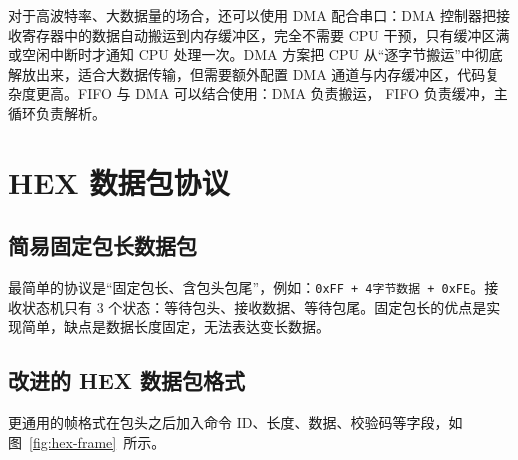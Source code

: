 对于高波特率、大数据量的场合，还可以使用 DMA 配合串口：DMA 控制器把接收寄存器中的数据自动搬运到内存缓冲区，完全不需要 CPU 干预，只有缓冲区满或空闲中断时才通知 CPU 处理一次。DMA 方案把 CPU 从“逐字节搬运”中彻底解放出来，适合大数据传输，但需要额外配置 DMA 通道与内存缓冲区，代码复杂度更高。FIFO 与 DMA 可以结合使用：DMA 负责搬运， FIFO 负责缓冲，主循环负责解析。

\section{HEX 数据包协议}

\subsection{简易固定包长数据包}

最简单的协议是“固定包长、含包头包尾”，例如：\texttt{0xFF + 4字节数据 + 0xFE}。接收状态机只有 3 个状态：等待包头、接收数据、等待包尾。固定包长的优点是实现简单，缺点是数据长度固定，无法表达变长数据。

\subsection{改进的 HEX 数据包格式}

更通用的帧格式在包头之后加入命令 ID、长度、数据、校验码等字段，如图~\ref{fig:hex-frame}~所示。

